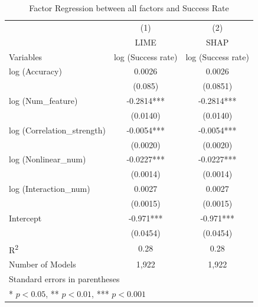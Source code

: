 \documentclass[mnsc,blindrev]{informs3}
\begin{document}
\begin{table}[h]
\centering
\caption{Factor Regression between all factors and Success Rate}
\begin{tabular}{lcc}
\toprule
 & (1) & (2) \\
 & LIME & SHAP \\

Variables & log (Success rate) & log (Success rate) \\
\midrule
log (Accuracy) & 0.0026 & 0.0026 \\
 & (0.085) & (0.0851) \\
log (Num\_feature) & -0.2814*** & -0.2814*** \\
 & (0.0140) & (0.0140) \\
log (Correlation\_strength) & -0.0054*** & -0.0054*** \\
 & (0.0020) & (0.0020) \\
log (Nonlinear\_num) & -0.0227*** & -0.0227*** \\
 & (0.0014) & (0.0014) \\
log (Interaction\_num) & 0.0027 & 0.0027 \\
 & (0.0015) & (0.0015) \\
Intercept & -0.971*** & -0.971*** \\
 & (0.0454) & (0.0454) \\
\midrule
R\textsuperscript{2} & 0.28 & 0.28 \\
Number of Models & 1,922 & 1,922 \\
\bottomrule
\multicolumn{3}{l}{Standard errors in parentheses} \\
\multicolumn{3}{l}{* $p<0.05$, ** $p<0.01$, *** $p<0.001$} \\
\end{tabular}
\end{table}
\end{document}
